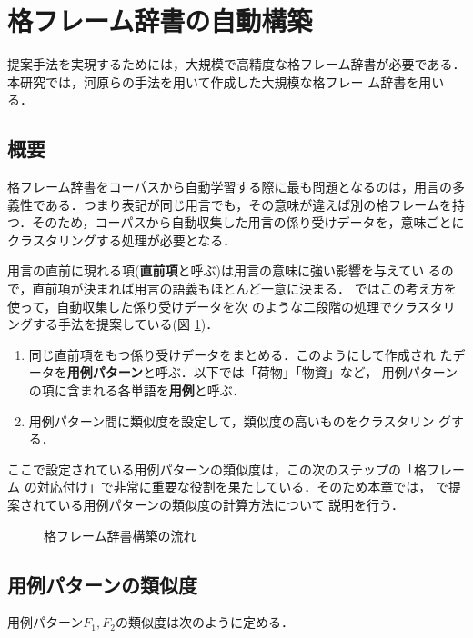 \section{格フレーム辞書の自動構築}

提案手法を実現するためには，大規模で高精度な格フレーム辞書が必要である．
本研究では，河原らの手法\cite{Kawahara01}を用いて作成した大規模な格フレー
ム辞書を用いる．


\subsection{概要}
格フレーム辞書をコーパスから自動学習する際に最も問題となるのは，用言の多
義性である．つまり表記が同じ用言でも，その意味が違えば別の格フレームを持
つ．そのため，コーパスから自動収集した用言の係り受けデータを，意味ごとに
クラスタリングする処理が必要となる．

用言の直前に現れる項({\bf 直前項}と呼ぶ)は用言の意味に強い影響を与えてい
るので，直前項が決まれば用言の語義もほとんど一意に決まる．
\cite{Kawahara01}ではこの考え方を使って，自動収集した係り受けデータを次
のような二段階の処理でクラスタリングする手法を提案している(図
\ref{AbstractCaseFrame})．

\begin{enumerate}
 \item 同じ直前項をもつ係り受けデータをまとめる．このようにして作成され
       たデータを{\bf 用例パターン}と呼ぶ．以下では「荷物」「物資」など，
       用例パターンの項に含まれる各単語を{\bf 用例}と呼ぶ．
 \item 用例パターン間に類似度を設定して，類似度の高いものをクラスタリン
       グする．
\end{enumerate}

ここで設定されている用例パターンの類似度は，この次のステップの「格フレーム
の対応付け」で非常に重要な役割を果たしている．そのため本章では，
\cite{Kawahara01}で提案されている用例パターンの類似度の計算方法について
説明を行う．

\begin{figure}[t]
 \begin{center}
  
  \caption{格フレーム辞書構築の流れ}
  \label{AbstractCaseFrame}
 \end{center}
\end{figure}


\subsection{用例パターンの類似度}
\label{CFSim}
用例パターン$F_1,F_2$の類似度は次のように定める．


